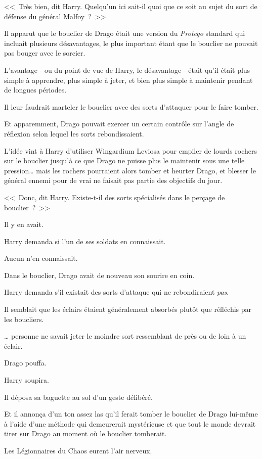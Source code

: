 <<~Très bien, dit Harry. Quelqu'un ici sait-il quoi que ce soit au sujet du sort de défense du général Malfoy~?~>>

Il apparut que le bouclier de Drago était une version du \emph{Protego} standard qui incluait plusieurs désavantages, le plus important étant que le bouclier ne pouvait pas bouger avec le sorcier.

L'avantage - ou du point de vue de Harry, le désavantage - était qu'il était plus simple à apprendre, plus simple à jeter, et bien plus simple à maintenir pendant de longues périodes.

Il leur faudrait marteler le bouclier avec des sorts d'attaquer pour le faire tomber.

Et apparemment, Drago pouvait exercer un certain contrôle sur l'angle de réflexion selon lequel les sorts rebondissaient.

L'idée vint à Harry d'utiliser Wingardium Leviosa pour empiler de lourds rochers sur le bouclier jusqu'à ce que Drago ne puisse plus le maintenir sous une telle pression… mais les rochers pourraient alors tomber et heurter Drago, et blesser le général ennemi pour de vrai ne faisait pas partie des objectifs du jour.

<<~Donc, dit Harry. Existe-t-il des sorts spécialisés dans le perçage de bouclier~?~>>

Il y en avait.

Harry demanda si l'un de ses soldats en connaissait.

Aucun n'en connaissait.

Dans le bouclier, Drago avait de nouveau son sourire en coin.

Harry demanda s'il existait des sorts d'attaque qui ne rebondiraient \emph{pas}.

Il semblait que les éclairs étaient généralement absorbés plutôt que réfléchis par les boucliers.

… personne ne savait jeter le moindre sort ressemblant de près ou de loin à un éclair.

Drago pouffa.

Harry soupira.

Il déposa sa baguette au sol d'un geste délibéré.

Et il annonça d'un ton assez las qu'il ferait tomber le bouclier de Drago lui-même à l'aide d'une méthode qui demeurerait mystérieuse et que tout le monde devrait tirer sur Drago au moment où le bouclier tomberait.

Les Légionnaires du Chaos eurent l'air nerveux.


